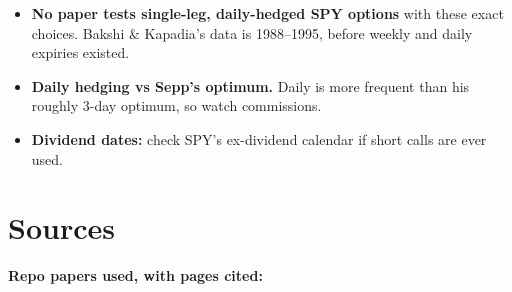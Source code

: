 \documentclass{article}
\begin{document}
\begin{itemize}

\item \textbf{No paper tests single-leg, daily-hedged SPY options} with these exact choices. Bakshi \& Kapadia's data is 1988--1995, before weekly and daily expiries existed.

\item \textbf{Daily hedging vs Sepp's optimum.} Daily is more frequent than his roughly 3-day optimum, so watch commissions.

\item \textbf{Dividend dates:} check SPY's ex-dividend calendar if short calls are ever used.

\end{itemize}

\section{Sources}

\textbf{Repo papers used, with pages cited:}
\end{document}
